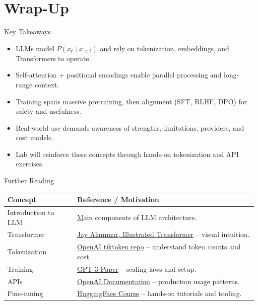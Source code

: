 \documentclass[aspectratio=169]{beamer}
\begin{document}
\section{Wrap-Up}

\begin{frame}{Key Takeaways}
  \begin{itemize}
    \item LLMs model $P(x_t \mid x_{<t})$ and rely on tokenization, embeddings, and Transformers to operate.
    \item Self-attention + positional encodings enable parallel processing and long-range context.
    \item Training spans massive pretraining, then alignment (SFT, RLHF, DPO) for safety and usefulness.
    \item Real-world use demands awareness of strengths, limitations, providers, and cost models.
    \item Lab will reinforce these concepts through hands-on tokenization and API exercises.
  \end{itemize}
\end{frame}

\begin{frame}{Further Reading}
  \begin{tabular}{@{}lp{6.8cm}@{}}
    Concept & Reference / Motivation \\
    \midrule
    Introduction to LLM & \href{https://learn.deeplearning.ai/courses/how-transformer-llms-work} Main components of LLM architecture. \\
    Transformer & \href{https://jalammar.github.io/illustrated-transformer/}{Jay Alammar, Illustrated Transformer} -- visual intuition. \\
    Tokenization & \href{https://github.com/openai/tiktoken}{OpenAI tiktoken repo} -- understand token counts and cost. \\
    Training & \href{https://arxiv.org/abs/2005.14165}{GPT-3 Paper} -- scaling laws and setup. \\
    APIs & \href{https://platform.openai.com/docs}{OpenAI Documentation} -- production usage patterns. \\
    Fine-tuning & \href{https://huggingface.co/course}{HuggingFace Course} -- hands-on tutorials and tooling. \\
  \end{tabular}
\end{frame}
\end{document}
